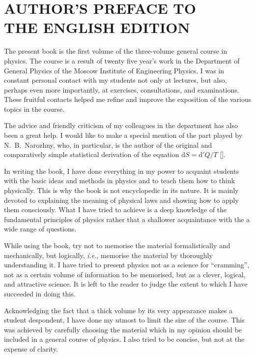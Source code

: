 

\chapter*{AUTHOR'S PREFACE TO\\ THE ENGLISH EDITION}


The present book is the first volume of the three-volume general course in physics. The course is a result of twenty five year's work in the Department of General Physics of the Moscow Institute of Engineering Physics. I was in constant personal contact with my students not only at lectures, but also, perhaps even more importantly, at exercises, consultations, and examinations. These fruitful contacts helped me refine and improve the exposition of the various topics in the course.

The advice and friendly criticism of my colleagues in the department has also been a great help. I would like to make a special mention of the part played by N.~B.~Narozhny, who, in particular, is the author of the original and comparatively simple statistical derivation of the equation $\mathrm{d}S = \mathrm{d}'Q/T$ [].

In writing the book, I have done everything in my power to acquaint students with the basic ideas and methods in physics and to teach them how to think physically. This is why the book is not encyclopedic in its nature. It is mainly devoted to explaining the meaning of physical laws and showing how to apply them consciously. What I have tried to achieve is a deep knowledge of the fundamental principles of physics rather that a shallower acquaintance with the a wide range of questions.

While using the book, try not to memorise the material formalistically and mechanically, but logically, \textit{i.e.}, memorise the material by thoroughly understanding it. I have tried to present physics not as a science for  ``cramming'', not as a certain volume of information to be memorised, but as a clever, logical, and attractive science. It is left to the reader to judge the extent to which I have succeeded in doing this.

Acknowledging the fact that a thick volume by its very appearance makes a student despondent, I have done my utmost to limit the size of the course. This was achieved by carefully choosing the material which in my opinion should be included in a general course of physics. I also tried to be concise, but not at the expense of clarity.

